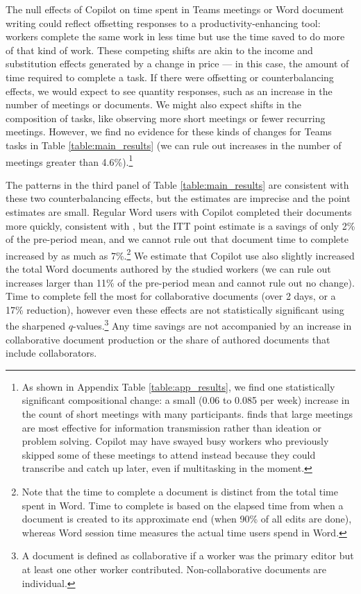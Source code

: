 \documentclass{article}
\begin{document}
The null effects of Copilot on time spent in Teams meetings or Word document writing could reflect offsetting responses to a productivity-enhancing tool: workers complete the same work in less time but use the time saved to do more of that kind of work. These competing shifts are akin to the income and substitution effects generated by a change in price --- in this case, the amount of time required to complete a task. If there were offsetting or counterbalancing effects, we would expect to see quantity responses, such as an increase in the number of meetings or documents. We might also expect  shifts in the composition of tasks, like observing more short meetings or fewer recurring meetings. However, we find no evidence for these kinds of changes for Teams tasks in Table \ref{table:main_results} (we can rule out increases in the number of meetings greater than 4.6\%).\footnote{As shown in Appendix Table \ref{table:app_results}, we find one statistically significant compositional change: a small (0.06 to 0.085 per week) increase in the count of short meetings with many participants. \citet{rogelberg2019surprising} finds that large meetings are most effective for information transmission rather than ideation or problem solving. Copilot may have swayed busy workers who previously skipped some of these meetings to attend instead because they could transcribe and catch up later, even if multitasking in the moment.} 

The patterns in the third panel of Table \ref{table:main_results} are consistent with these two counterbalancing effects, but the estimates are imprecise and the point estimates are small. Regular Word users with Copilot completed their documents more quickly, consistent with \citet{noy2023experimental}, but the ITT point estimate is a savings of only 2\% of the pre-period mean, and we cannot rule out that document time to complete increased by as much as 7\%.\footnote{Note that the time to complete a document is distinct from the total time spent in Word. Time to complete is based on the elapsed time from when a document is created to its approximate end (when 90\% of all edits are done), whereas Word session time measures the actual time users spend in Word.} We estimate that Copilot use also slightly increased the total Word documents authored by the studied workers (we can rule out increases larger than 11\% of the pre-period mean and cannot rule out no change). Time to complete fell the most for collaborative documents (over 2 days, or a 17\% reduction), however even these effects are not statistically significant using the sharpened $q$-values.\footnote{A document is defined as collaborative if a worker was the primary editor but at least one other worker contributed. Non-collaborative documents are individual.} Any time savings are not accompanied by an increase in collaborative document production or the share of authored documents that include collaborators. 
\end{document}
